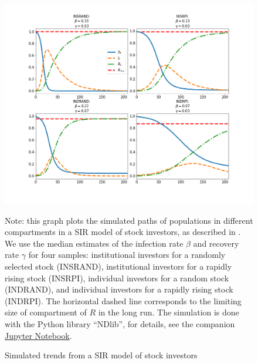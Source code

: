 \begin{figure}[!ht] \centering  %
	\caption{Simulated trends from a SIR model of stock investors}
	\label{fig:sir_simulate}
	\centerline{\includegraphics[width=\textwidth]{./figures/sir_simulate.png}}
	\begin{flushleft}
	{\footnotesize Note: this graph plots the simulated paths of populations in different compartments in a SIR model of stock investors, as described in \cite{shiller1989survey}. We use the median estimates of the infection rate $\beta$ and recovery rate $\gamma$ for four samples: institutional investors for a randomly selected stock (INSRAND), institutional investors for a rapidly rising stock (INSRPI), individual investors for a random stock (INDRAND), and individual investors for a rapidly rising stock (INDRPI). The horizontal dashed line corresponds to the limiting size of compartment of $R$ in the long run. The simulation is done with the Python library ``NDlib'', for details, see the companion \href{https://github.com/iworld1991/EpiExp/blob/master/Python/SIR_Ndlib.ipynb}{Jupyter Notebook}. }
				\end{flushleft}
\end{figure}




\newpage

